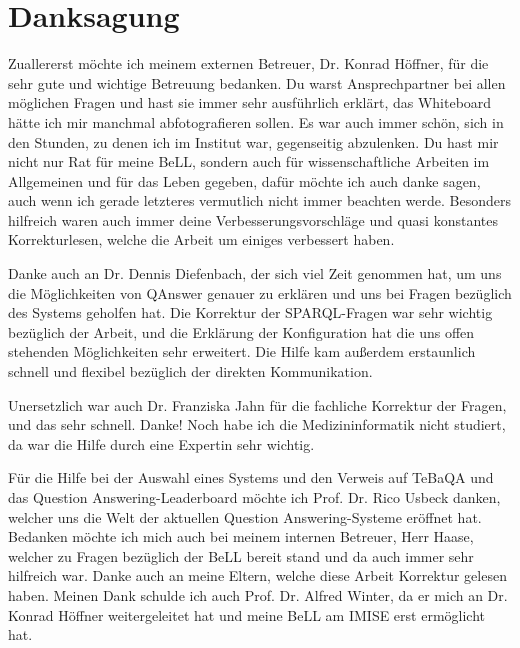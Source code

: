 


\bigskip

\begingroup
\let\clearpage\relax
\let\cleardoublepage\relax
\let\cleardoublepage\relax
\chapter*{Danksagung}

Zuallererst möchte ich meinem externen Betreuer, Dr. Konrad Höffner, für die sehr gute und wichtige Betreuung bedanken.
Du warst Ansprechpartner bei allen möglichen Fragen und hast sie immer sehr ausführlich erklärt, das Whiteboard hätte ich mir manchmal abfotografieren sollen.
Es war auch immer schön, sich in den Stunden, zu denen ich im Institut war, gegenseitig abzulenken.
Du hast mir nicht nur Rat für meine BeLL, sondern auch für wissenschaftliche Arbeiten im Allgemeinen und für das Leben gegeben, dafür möchte ich auch danke sagen, auch wenn ich gerade letzteres vermutlich nicht immer beachten werde.
Besonders hilfreich waren auch immer deine Verbesserungsvorschläge und quasi konstantes Korrekturlesen, welche die Arbeit um einiges verbessert haben.

Danke auch an Dr. Dennis Diefenbach, der sich viel Zeit genommen hat, um uns die Möglichkeiten von QAnswer genauer zu erklären und uns bei Fragen bezüglich des Systems geholfen hat.
Die Korrektur der SPARQL-Fragen war sehr wichtig bezüglich der Arbeit, und die Erklärung der Konfiguration hat die uns offen stehenden Möglichkeiten sehr erweitert.
Die Hilfe kam außerdem erstaunlich schnell und flexibel bezüglich der direkten Kommunikation.

Unersetzlich war auch Dr. Franziska Jahn für die fachliche Korrektur der Fragen, und das sehr schnell.
Danke!
Noch habe ich die Medizininformatik nicht studiert, da war die Hilfe durch eine Expertin sehr wichtig.

Für die Hilfe bei der Auswahl eines Systems und den Verweis auf TeBaQA und das Question Answering-Leaderboard möchte ich Prof. Dr. Rico Usbeck danken, welcher uns die Welt der aktuellen Question Answering-Systeme eröffnet hat.
Bedanken möchte ich mich auch bei meinem internen Betreuer, Herr Haase, welcher zu Fragen bezüglich der BeLL bereit stand und da auch immer sehr hilfreich war.
Danke auch an meine Eltern, welche diese Arbeit Korrektur gelesen haben.
Meinen Dank schulde ich auch Prof. Dr. Alfred Winter, da er mich an Dr. Konrad Höffner weitergeleitet hat und meine BeLL am IMISE erst ermöglicht hat.

\endgroup
